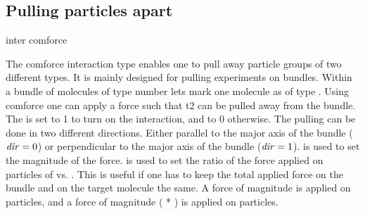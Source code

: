 \subsection{Pulling particles apart}
\begin{essyntax}
  inter  
  comforce    
  \begin{features}
  \end{features}
\end{essyntax}
The comforce interaction type enables one to pull away particle groups
of two different types. It is mainly designed for pulling experiments
on bundles. Within a bundle of molecules of type number 
lets mark one molecule as of type . Using comforce one
can apply a force such that t2 can be pulled away from the bundle. The
 is set to 1 to turn on the interaction, and to 0
otherwise. The pulling can be done in two different directions. Either
parallel to the major axis of the bundle ($\mathrm{\mathit{dir}} = 0$) or
perpendicular to the major axis of the bundle ($\mathrm{\mathit{dir}} = 1$).
 is used to set the magnitude of the force.  
is used to set the ratio of the force applied on particles of
 vs. . This is useful if one has to keep the
total applied force on the bundle and on the target molecule the same.
A force of magnitude  is applied on 
particles, and a force of magnitude ( * ) is
applied on  particles.

